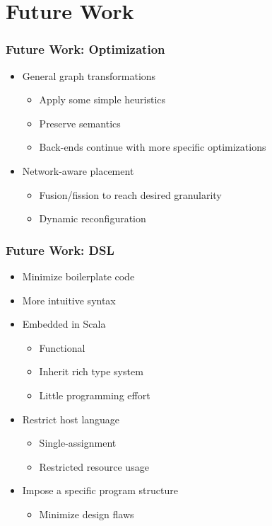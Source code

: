 \documentclass{beamer}
\newenvironment{mysubsec}[1]
{   \begin{frame}
	\frametitle{#1} }
{ \end{frame} }
\begin{document}
\section{Future Work}
	\begin{mysubsec}{Future Work: Optimization}
		\begin{itemize}
		\item General graph transformations
			\begin{itemize}
			\item Apply some simple heuristics
			\item Preserve semantics
			\item Back-ends continue with more specific optimizations
			\end{itemize}
		\item Network-aware placement
			\begin{itemize}
			\item Fusion/fission to reach desired granularity
			\item Dynamic reconfiguration
			\end{itemize}
		\end{itemize}
	\end{mysubsec}
	\begin{mysubsec}{Future Work: DSL}		
		\begin{itemize}
		\item Minimize boilerplate code
		\item More intuitive syntax
		\item Embedded in Scala
			\begin{itemize}
			\item Functional
			\item Inherit rich type system
			\item Little programming effort
			\end{itemize}
		\item Restrict host language
			\begin{itemize}
			\item Single-assignment
			\item Restricted resource usage
			\end{itemize}
		\item Impose a specific program structure 
			\begin{itemize} \item Minimize design flaws \end{itemize}
		\end{itemize}
	\end{mysubsec}
\end{document}

